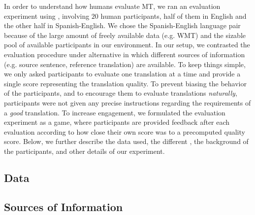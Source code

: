 In order to understand how humans evaluate MT, we ran an evaluation experiment using \eye, involving $20$ human participants, half of them \mono in English and the other half \bil in Spanish-English. We chose the Spanish-English language pair because of the large amount of freely available data (e.g. WMT) and the sizable pool of available participants in our environment. In our setup, we contrasted the evaluation procedure under alternative \gamets in which different sources of information (e.g. source sentence, reference translation) are available.  To keep things simple, we only asked participants to evaluate one translation at a time and provide a single score representing the translation quality. To prevent biasing the behavior of the participants, and to encourage them to evaluate translations \emph{naturally}, participants were not given any precise instructions regarding the requirements of a \emph{good} translation. To increase engagement, we formulated the evaluation experiment as a game, where participants are provided feedback after each evaluation according to how close their own score was to a precomputed quality score. Below, we further describe the data used, the different \gamets, the background of the participants, and other details of our experiment. %

\subsection{Data}



\subsection{Sources of Information}
\vspace{5pt}

